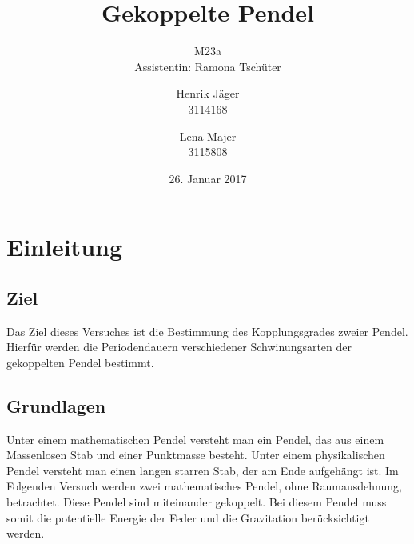 \documentclass[12pt,a4paper,]{scrreprt}
\begin{document}
\title{Gekoppelte Pendel}
\author{Henrik Jäger \\ 3114168 \and Lena Majer \\ 3115808}
\subtitle{M23a \\  Assistentin: Ramona Tschüter}
\subject{Physikalisches Praktikum I}
\publishers{Universität Stuttgart}
\date{26. Januar 2017}

\maketitle%

\tableofcontents   %
\pagebreak
\chapter{Einleitung}
\section{Ziel}
Das Ziel dieses Versuches ist die Bestimmung des Kopplungsgrades zweier Pendel. Hierfür werden die Periodendauern verschiedener Schwinungsarten der gekoppelten Pendel bestimmt.
\section{Grundlagen}
Unter einem mathematischen Pendel versteht man ein Pendel, das aus einem Massenlosen Stab und einer Punktmasse besteht.
Unter einem physikalischen Pendel versteht man einen langen starren Stab, der am Ende aufgehängt ist.
Im Folgenden Versuch werden zwei mathematisches Pendel, ohne Raumausdehnung,  betrachtet. Diese Pendel sind miteinander gekoppelt. Bei diesem Pendel muss somit die potentielle Energie der Feder und die Gravitation  berücksichtigt werden.
\end{document}
